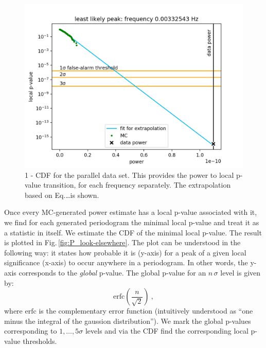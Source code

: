 \begin{figure}
  \centering
  \includegraphics[width=0.9\linewidth]{gfx/axions/P_best_signal_candidate.png}
  \caption{1 - CDF for the parallel data set. This provides the power to local p-value transition, for each frequency separately. The extrapolation based on Eq.\ldots is shown.}
  \label{fig:P_best_signal_candidate}
\end{figure}

Once every MC-generated power estimate has a local p-value associated with it, we find for each generated periodogram the minimal local p-value and treat it as a statistic in itself. We estimate the CDF of the minimal local p-value. The result is plotted in Fig.\,\ref{fig:P_look-elsewhere}. The plot can be understood in the following way: it states how probable it is (y-axis) for a peak of a given local significance (x-axis) to occur anywhere in a periodogram. In other words, the y-axis corresponds to the \emph{global} p-value. The global p-value for an $n\,\sigma$ level is given by:
\begin{equation}
  \mathrm{erfc}\left( \frac{n}{\sqrt{2}} \right)\ ,
\end{equation}
where $\mathrm{erfc}$ is the complementary error function (intuitively understood as ``one minus the integral of the gaussion distribution''). We mark the global p-values corresponding to $1,\ldots,5\sigma$ levels and via the CDF find the corresponding local p-value thresholds.

